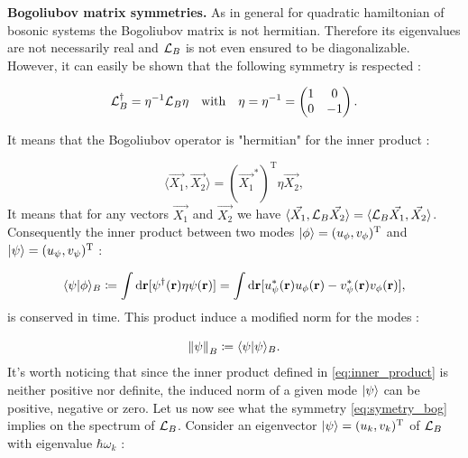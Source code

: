 \bigskip

\textbf{Bogoliubov matrix symmetries.} As in general for quadratic hamiltonian of bosonic systems \cite{castin_bose-einstein_2001} the Bogoliubov matrix is not hermitian. Therefore its eigenvalues are not 
necessarily real and $\mathcal{L}_B$ is not even ensured to be diagonalizable. However, it can easily be shown that the following symmetry is respected :

\begin{equation}
    \Lbog^\dagger = \eta^{-1} \Lbog \eta \ \ \ \mathrm{with} \ \ \ \eta = \eta^{-1} =\begin{pmatrix}
        1 & 0 \\
        0 & -1
    \end{pmatrix}.
    \label{eq:symetry_bog}
\end{equation}

It means that the Bogoliubov operator is "hermitian" for the inner product :

\begin{equation}
    \langle \vec{X_1},\vec{X_2} \rangle = (\vec{X_1}^*)^{\mathrm{T}} \eta \vec{X_2},
    \label{eq:inner_product}
\end{equation}
It means that for any vectors $\vec{X_1}$ and $\vec{X_2}$ we have $\langle \vec{X_1},\mathcal{L}_B\vec{X_2} \rangle = \langle \mathcal{L}_B\vec{X_1},\vec{X_2} \rangle$. 
Consequently the inner product between two modes $\ket{\phi}= (u_{\phi}, v_{\phi})^\mathrm{T}$ and $\ket{\psi}=(u_{\psi}, v_{\psi})^\mathrm{T}$ :

\begin{equation}
    \langle \psi| \phi \rangle_B \coloneqq \int \mathrm{d}\mathbf{r}[\psi^\dagger(\mathbf{r})\eta\psi(\mathbf{r})] = \int \mathrm{d}\mathbf{r}[u_{\psi}^*(\mathbf{r})u_{\phi}(\mathbf{r})-v_{\psi}^*(\mathbf{r})v_{\phi}(\mathbf{r})],
    \label{eq:inner_product}
\end{equation}
is conserved in time. This product induce a modified norm for the modes : 

\begin{equation}
    \norm{\psi}_{B}\coloneqq \langle \psi| \psi \rangle_B.
    \label{eq:modified_norm}
\end{equation}
It's worth noticing that since the inner product defined in \autoref{eq:inner_product} is neither positive nor definite, the induced norm of a given mode $\ket{\psi}$
can be positive, negative or zero. Let us now see what the symmetry \autoref{eq:symetry_bog} implies on the spectrum of $\mathcal{L}_B$. Consider an eigenvector $\ket{\psi}= (u_k,v_k)^\mathrm{T}$ of $\mathcal{L}_B$ with eigenvalue $\hbar\omega_k$ : 

